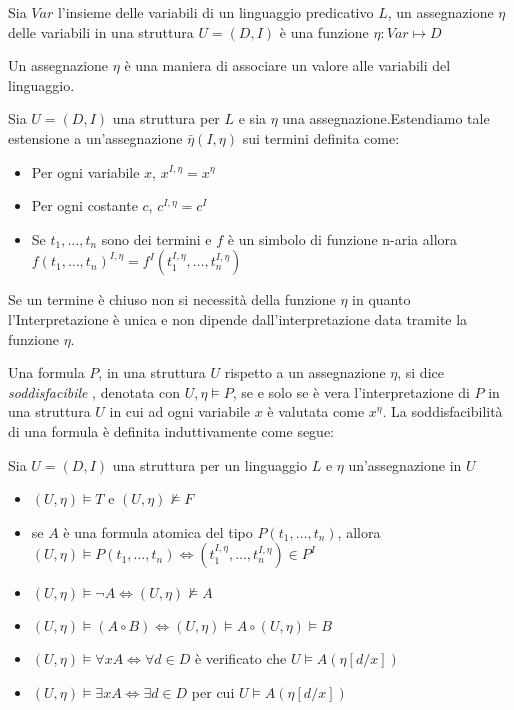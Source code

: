 \begin{defi}
    Sia $Var$ l'insieme delle variabili di un linguaggio predicativo $L$, un assegnazione $\eta$
    delle variabili in una struttura $U = (D,I)$ è una funzione $\eta:Var \mapsto D$
\end{defi}
Un assegnazione $\eta$ è una maniera di associare un valore alle variabili del linguaggio.

\begin{defi}
    Sia $U =(D,I)$ una struttura per $L$ e sia $\eta$ una assegnazione.Estendiamo
    tale estensione a un'assegnazione $\bar{\eta}(I,\eta)$ sui termini definita come:
    \begin{itemize}
        \item Per ogni variabile $x$, $x^{I,\eta} = x^{\eta}$
        \item Per ogni costante $c$, $c ^{I,\eta} = c^I$
        \item Se $t_1,\dots,t_n$ sono dei termini e $f$ è un simbolo di funzione n-aria
              allora $f(t_1,\dots,t_n)^{I,\eta} = f^I(t_1 ^{I,\eta},\dots,t_n ^{I,\eta})$
    \end{itemize}

Se un termine è chiuso non si necessità della funzione $\eta$ in quanto l'Interpretazione
è unica e non dipende dall'interpretazione data tramite la funzione $\eta$.

Una formula $P$, in una struttura $U$ rispetto a un assegnazione $\eta$, si dice \emph{soddisfacibile}
, denotata con $U,\eta \models P$, se e solo se è vera l'interpretazione di $P$
in una struttura $U$ in cui ad ogni variabile $x$ è valutata come $x^{\eta}$.
La soddisfacibilità di una formula è definita induttivamente come segue:

\begin{defi}
    Sia $U = (D,I)$ una struttura per un linguaggio $L$ e $\eta$ un'assegnazione in $U$
    \begin{itemize}
        \item $(U,\eta) \models T$ e $(U,\eta) \not \models F$
        \item se $A$ è una formula atomica del tipo $P(t_1,\dots,t_n)$, allora
              $(U,\eta) \models P(t_1,\dots,t_n) \iff (t_1^{I,\eta},\dots,t_n^{I,\eta}) \in P^I$
        \item $(U,\eta) \models \neg A \iff (U,\eta) \not \models A$
        \item $(U,\eta) \models (A \circ B) \iff (U,\eta) \models A \circ (U,\eta) \models B$
        \item $(U,\eta) \models \forall x A \iff \forall d \in D$ è verificato che $U \models A(\eta[d/x])$
        \item $(U,\eta) \models \exists x A \iff \exists d \in D$ per cui $U \models A(\eta[d/x])$
    \end{itemize}
\end{defi}


\end{defi}
